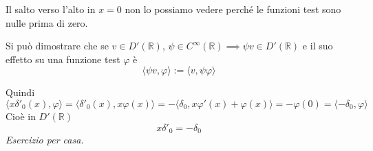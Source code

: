 Il salto verso l'alto in $x=0$ non lo possiamo vedere perché le funzioni test sono nulle prima di zero.
\Soluzione
\begin{rem}
Si può dimostrare che se $v\in D'(\mathbb{R})$, $\psi \in C^{\infty }(\mathbb{R}) \implies \psi v\in D'(\mathbb{R})$ e il suo effetto su una funzione test $\varphi $ è
\begin{equation*}
\langle \psi v,\varphi \rangle :=\langle v,\psi \varphi \rangle 
\end{equation*}
\end{rem}
Quindi
\begin{equation*}
\langle x\delta '_{0} (x),\varphi \rangle =\langle \delta '_{0} (x),x\varphi ( x) \rangle =-\langle \delta _{0} ,x\varphi '( x) +\varphi ( x) \rangle =-\varphi ( 0) =\langle -\delta _{0} ,\varphi \rangle 
\end{equation*}
Cioè in $D'(\mathbb{R})$
\begin{equation*}
x\delta '_{0} =-\delta _{0}
\end{equation*}
\textit{Esercizio per casa.}

